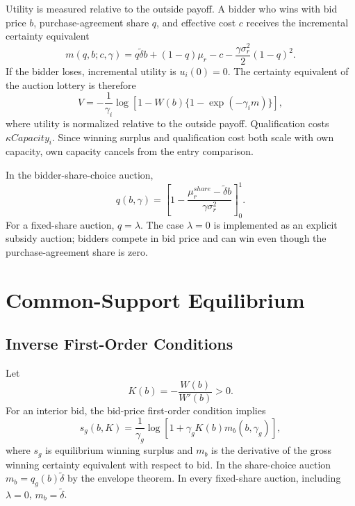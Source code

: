 \documentclass[10pt]{article}
\begin{document}
Utility is measured relative to the outside payoff.  A bidder who wins with
bid price $b$, purchase-agreement share $q$, and effective cost $c$ receives
the incremental certainty equivalent
\begin{equation}
m(q,b;c,\gamma)
=q\widetilde\delta b+(1-q)\mu_r-c
-\frac{\gamma\sigma_r^2}{2}(1-q)^2.
\label{eq:surplus}
\end{equation}
If the bidder loses, incremental utility is $u_i(0)=0$.  The certainty
equivalent of the auction lottery is therefore
\begin{equation}
V
=-\frac{1}{\gamma_i}\log\left[
1-W(b)\{1-\exp(-\gamma_i m)\}\right],
\label{eq:auction_value}
\end{equation}
where utility is normalized relative to the outside payoff.  Qualification
costs $\kappa Capacity_i$.  Since winning surplus and qualification cost both
scale with own capacity, own capacity cancels from the entry comparison.

In the bidder-share-choice auction,
\begin{equation}
q(b,\gamma)
=\left[
1-\frac{\mu_r^{share}-\widetilde\delta b}
{\gamma\sigma_r^2}
\right]_{0}^{1}.
\label{eq:q_choice}
\end{equation}
For a fixed-share auction, $q=\lambda$.  The case $\lambda=0$ is implemented
as an explicit subsidy auction; bidders compete in bid price and can win even
though the purchase-agreement share is zero.

\section{Common-Support Equilibrium}

\subsection{Inverse First-Order Conditions}

Let
\begin{equation}
K(b)=-\frac{W(b)}{W'(b)}>0.
\label{eq:K}
\end{equation}
For an interior bid, the bid-price first-order condition implies
\begin{equation}
s_g(b,K)
=\frac{1}{\gamma_g}
\log\left[1+\gamma_gK(b)m_b(b,\gamma_g)\right],
\label{eq:surplus_inverse}
\end{equation}
where $s_g$ is equilibrium winning surplus and $m_b$ is the derivative of the
gross winning certainty equivalent with respect to bid.  In the share-choice
auction $m_b=q_g(b)\widetilde\delta$ by the envelope theorem.  In every
fixed-share auction, including $\lambda=0$, $m_b=\widetilde\delta$.
\end{document}
